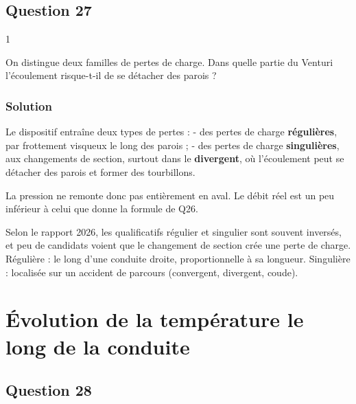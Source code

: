 \documentclass[11pt,a4paper]{article}
\begin{document}
\hypertarget{question-27}{%
\subsection{Question 27}\label{question-27}}

\begin{indication}{1}

On distingue deux familles de pertes de charge. Dans quelle partie du Venturi l'écoulement risque-t-il de se détacher des parois ?

\end{indication}

\hypertarget{solution-26}{%
\subsubsection{Solution}\label{solution-26}}

Le dispositif entraîne deux types de pertes :
- des pertes de charge \textbf{régulières}, par frottement visqueux le long des parois ;
- des pertes de charge \textbf{singulières}, aux changements de section, surtout dans le \textbf{divergent}, où l'écoulement peut se détacher des parois et former des tourbillons.

La pression ne remonte donc pas entièrement en aval. Le débit réel est un peu inférieur à celui que donne la formule de Q26.

\begin{piege}

Selon le rapport 2026, les qualificatifs régulier et singulier sont souvent inversés, et peu de candidats voient que le changement de section crée une perte de charge. Régulière : le long d'une conduite droite, proportionnelle à sa longueur. Singulière : localisée sur un accident de parcours (convergent, divergent, coude).

\end{piege}

\hypertarget{uxe9volution-de-la-tempuxe9rature-le-long-de-la-conduite}{%
\section{Évolution de la température le long de la conduite}\label{uxe9volution-de-la-tempuxe9rature-le-long-de-la-conduite}}

\hypertarget{question-28}{%
\subsection{Question 28}\label{question-28}}
\end{document}
